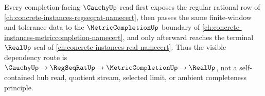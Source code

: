 Every completion-facing $\CauchyUp$ read first exposes the regular rational row of \autoref{ch:concrete-instances-regseqrat-namecert}, then passes the same finite-window and tolerance data to the $\MetricCompletionUp$ boundary of \autoref{ch:concrete-instances-metriccompletion-namecert}, and only afterward reaches the terminal $\RealUp$ seal of \autoref{ch:concrete-instances-real-namecert}. Thus the visible dependency route is $\CauchyUp \to \RegSeqRatUp \to \MetricCompletionUp \to \RealUp$, not a self-contained hub read, quotient stream, selected limit, or ambient completeness principle.
